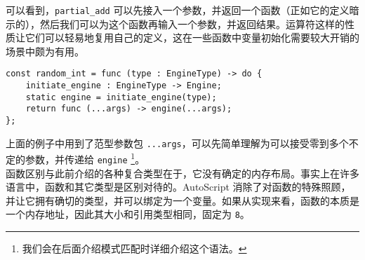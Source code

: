 可以看到，\texttt{partial\_add} 可以先接入一个参数，并返回一个函数（正如它的定义暗示的），然后我们可以为这个函数再输入一个参数，并返回结果。运算符这样的性质让它们可以轻易地复用自己的定义，这在一些函数中变量初始化需要较大开销的场景中颇为有用。

\begin{lstlisting}
const random_int = func (type : EngineType) -> do {
    initiate_engine : EngineType -> Engine;
    static engine = initiate_engine(type);
    return func (...args) -> engine(...args);
};
\end{lstlisting}

上面的例子中用到了范型参数包 \lstinline!...args!，可以先简单理解为可以接受零到多个不定的参数，并传递给 \lstinline!engine! \footnote{我们会在后面介绍模式匹配时详细介绍这个语法。}。 \\

函数区别与此前介绍的各种复合类型在于，它没有确定的内存布局。事实上在许多语言中，函数和其它类型是区别对待的。AutoScript 消除了对函数的特殊照顾，并让它拥有确切的类型，并可以绑定为一个变量。如果从实现来看，函数的本质是一个内存地址，因此其大小和引用类型相同，固定为 \lstinline!8!。
